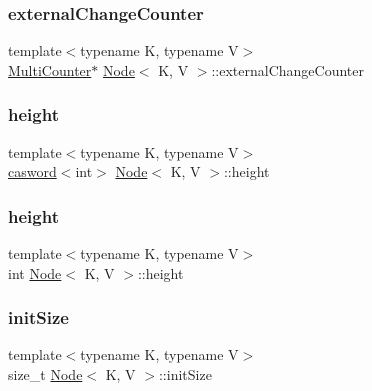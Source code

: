 \mbox{\label{classNode_a5de4abf9942c16e6d8938e78a69efb31}} 
\subsubsection{\texorpdfstring{external\+Change\+Counter}{externalChangeCounter}}
{\footnotesize\ttfamily template$<$typename K, typename V$>$ \\
\hyperlink{classMultiCounter}{Multi\+Counter}$\ast$ \hyperlink{classNode}{Node}$<$ K, V $>$\+::external\+Change\+Counter}

\mbox{\label{classNode_aa416d66d3fba99e844a02109fe8e2419}} 
\subsubsection{\texorpdfstring{height}{height}\hspace{0.1cm}{\footnotesize\ttfamily [1/2]}}
{\footnotesize\ttfamily template$<$typename K, typename V$>$ \\
\hyperlink{structcasword}{casword}$<$int$>$ \hyperlink{classNode}{Node}$<$ K, V $>$\+::height}

\mbox{\label{classNode_ad8e961cf89a9b9f8e21f648c6ffb06ff}} 
\subsubsection{\texorpdfstring{height}{height}\hspace{0.1cm}{\footnotesize\ttfamily [2/2]}}
{\footnotesize\ttfamily template$<$typename K, typename V$>$ \\
int \hyperlink{classNode}{Node}$<$ K, V $>$\+::height}

\mbox{\label{classNode_aba5197eb2b00bef6628dcf30056a2d92}} 
\subsubsection{\texorpdfstring{init\+Size}{initSize}}
{\footnotesize\ttfamily template$<$typename K, typename V$>$ \\
size\+\_\+t \hyperlink{classNode}{Node}$<$ K, V $>$\+::init\+Size}

